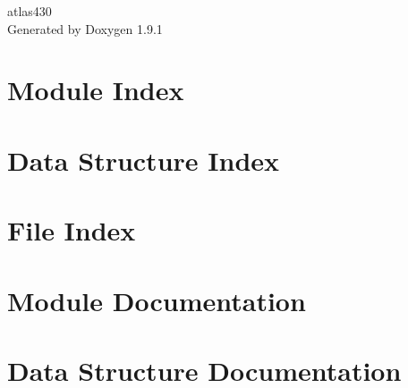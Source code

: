 \let\mypdfximage\pdfximage\def\pdfximage{\immediate\mypdfximage}\documentclass[twoside]{book}
\newcommand{\+}{\discretionary{\mbox{\scriptsize$\hookleftarrow$}}{}{}}
\newcommand{\clearemptydoublepage}{%
  \newpage{\pagestyle{empty}\cleardoublepage}%
}
\begin{document}
\raggedbottom

\hypersetup{pageanchor=false,
             bookmarksnumbered=true,
             pdfencoding=unicode
            }
\begin{titlepage}
\vspace*{7cm}
\begin{center}%
{\Large atlas430 }\\
\vspace*{1cm}
{\large Generated by Doxygen 1.9.1}\\
\end{center}
\end{titlepage}
\clearemptydoublepage
{}
\tableofcontents
\clearemptydoublepage
{}
\hypersetup{pageanchor=true}

\chapter{Module Index}

\chapter{Data Structure Index}

\chapter{File Index}

\chapter{Module Documentation}














\chapter{Data Structure Documentation}



















\end{document}
